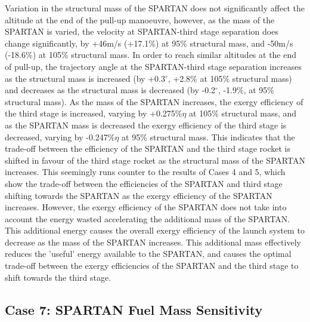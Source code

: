 Variation in the structural mass of the SPARTAN does not significantly affect the altitude at the end of the pull-up manoeuvre, however, as the mass of the SPARTAN is varied, the velocity at SPARTAN-third stage separation does change significantly, by +46m/s (+17.1\%) at 95\% structural mass, and -50m/s (-18.6\%) at 105\% structural mass. In order to reach similar altitudes at the end of pull-up, the trajectory angle at the SPARTAN-third stage separation increases as the structural mass is increased (by +0.3$^\circ$, +2.8\% at 105\% structural mass) and decreases as the structural mass is decreased (by -0.2$^\circ$, -1.9\%, at 95\% structural mass). 
As the mass of the SPARTAN increases, the exergy efficiency of the third stage is increased, varying by +0.275\%$\eta$ at 105\% structural mass, and as the SPARTAN mass is decreased the exergy efficiency of the third stage is decreased, varying by -0.247\%$\eta$ at 95\% structural mass. 
This indicates that the trade-off between the efficiency of the SPARTAN and the third stage rocket is shifted in favour of the third stage rocket as the structural mass of the SPARTAN increases. 
This seemingly runs counter to the results of Cases 4 and 5, which show the trade-off between the efficiencies of the SPARTAN and third stage shifting towards the SPARTAN as the exergy efficiency of the SPARTAN increases. 
However, the exergy efficiency of the SPARTAN does not take into account the energy wasted accelerating the additional mass of the SPARTAN. This additional energy causes the overall exergy efficiency of the launch system to decrease as the mass of the SPARTAN increases. This additional mass effectively reduces the 'useful' energy available to the SPARTAN, and causes the optimal trade-off between the exergy efficiencies of the SPARTAN and the third stage to shift towards the third stage. 

\subsection{Case 7: SPARTAN Fuel Mass Sensitivity} \label{sec:fuelmassNoReturn}

